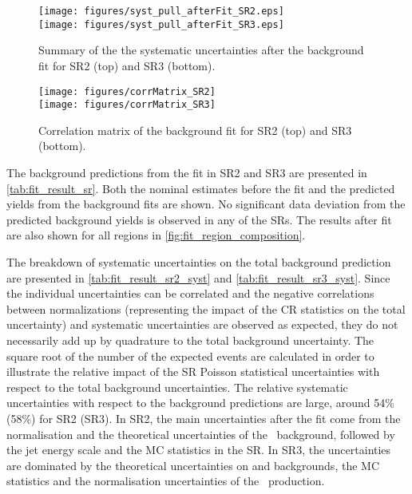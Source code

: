 \begin{figure}[h!]
  \begin{center}
     \texttt{[image: figures/syst\_pull\_afterFit\_SR2.eps]} \\
     \texttt{[image: figures/syst\_pull\_afterFit\_SR3.eps]}
     \caption{Summary of the the systematic uncertainties after the background fit for SR2 (top) and SR3 (bottom).}
     \label{fig:fit_unc_nuisance_SR}
  \end{center}
\end{figure}

\begin{figure}[h!]
  \begin{center}
     \texttt{[image: figures/corrMatrix\_SR2]} \\
     \texttt{[image: figures/corrMatrix\_SR3]} \\
     \caption{Correlation matrix of the background fit for SR2 (top) and SR3 (bottom).}
     \label{fig:fit_corr_SR}
  \end{center}
\end{figure}


The background predictions from the fit in SR2 and SR3 are presented in \Tab \ref{tab:fit_result_sr}. Both the nominal estimates
before the fit and the predicted yields from the background fits are shown.
No significant data deviation from the predicted background yields is observed in any of the SRs. The results after fit are
also shown for all regions in \Fig \ref{fig:fit_region_composition}.

The breakdown of systematic
uncertainties on the total background prediction are presented in \Tab \ref{tab:fit_result_sr2_syst} and \ref{tab:fit_result_sr3_syst}.
Since the individual uncertainties can be correlated and the negative correlations between normalizations (representing the
impact of the CR statistics on the total uncertainty) and systematic uncertainties are observed as expected, they
do not necessarily add up by quadrature to the total background uncertainty. The square
root of the number of the expected events are calculated in order to illustrate the relative impact of the
SR Poisson statistical uncertainties with respect to the total background uncertainties. The
 relative systematic uncertainties with respect to the background predictions are large, around 54\% (58\%) for SR2 (SR3). In SR2, the main uncertainties after the fit come from the normalisation and the theoretical uncertainties of the \ttbargam\ background, followed by the jet energy scale and the MC statistics in the SR. In SR3, the uncertainties are dominated by the theoretical uncertainties on \zgam and \gjet backgrounds, the MC statistics and the normalisation uncertainties of the \wgamma\ production.

